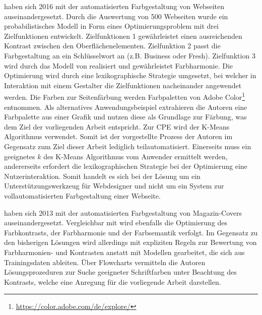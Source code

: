\citet{webpage} haben sich 2016 mit der automatisierten Farbgestaltung von Webseiten auseinandergesetzt. Durch die Auswertung von 500 Webseiten wurde ein probabilistisches Modell in Form eines Optimierungsproblem mit drei Zielfunktionen entwickelt. Zielfunktionen 1 gewährleistet einen ausreichenden Kontrast zwischen den Oberflächenelementen. Zielfunktion 2 passt die Farbgestaltung an ein Schlüsselwort an (z.B. \glqq{}Business\grqq{} oder \glqq{}Fresh\grqq{}). Zielfunktion 3 wird durch das Modell von \citet{colorcomp} realisiert und gewährleistet Farbharmonie. Die Optimierung wird durch eine lexikographische Strategie umgesetzt, bei welcher in Interaktion mit einem Gestalter die Zielfunktionen nacheinander angewendet werden. Die Farben zur Seitenfärbung werden Farbpaletten von Adobe Color\footnote{\url{https://color.adobe.com/de/explore/}} entnommen. Als alternatives Anwendungsbeispiel extrahieren die Autoren eine Farbpalette aus einer Grafik und nutzen diese als Grundlage zur Färbung, was dem Ziel der vorliegenden Arbeit entspricht. Zur CPE wird der K-Means Algorithmus verwendet. Somit ist der vorgestellte Prozess der Autoren im Gegensatz zum Ziel dieser Arbeit lediglich teilautomatisiert. Einerseits muss ein geeignetes $k$ des K-Means Algorithmus vom Anwender ermittelt werden, andererseits erfordert die lexikographischen Strategie bei der Optimierung eine Nutzerinteraktion. Somit handelt es sich bei der Lösung um ein Unterstützungswerkzeug für Webdesigner und nicht um ein System zur vollautomatisierten Farbgestaltung einer Webseite.

\citet{magazines}  haben sich 2013 mit der automatisierten Farbgestaltung von Magazin-Covers auseinandergesetzt. Vergleichbar mit \citep{webpage} wird ebenfalls die Optimierung des Farbkontrasts, der Farbharmonie und der Farbsemantik verfolgt. Im Gegensatz zu den bisherigen Lösungen wird allerdings mit expliziten Regeln zur Bewertung von Farbharmonien- \citep{itten} und Kontrasten anstatt mit Modellen gearbeitet, die sich aus Trainingsdaten ableiten. Über Flowcharts vermitteln die Autoren Lösungsprozeduren zur Suche geeigneter Schriftfarben unter Beachtung des Kontrasts, welche eine Anregung für die vorliegende Arbeit darstellen.